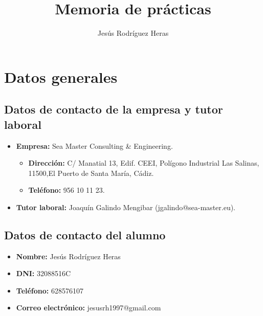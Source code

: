 \documentclass[12pt,letterpaper]{article}
\title{Memoria de prácticas}
\author{Jesús Rodríguez Heras}
\begin{document}
	
	\maketitle
%			
	\thispagestyle{empty}
	\newpage
	
	\tableofcontents
	\newpage
	
	
	
	
	\lstset{language=bash, numbers=left, numberstyle=\tiny, numbersep=10pt, firstnumber=1, stepnumber=1, basicstyle=\small\ttfamily, tabsize=1, extendedchars=true, inputencoding=utf8/latin1, breaklines=true}
	
\section{Datos generales}
\subsection{Datos de contacto de la empresa y tutor laboral}
\begin{itemize}
	\item \textbf{Empresa:} Sea Master Consulting \& Engineering.
	\begin{itemize}
		\item \textbf{Dirección:} C/ Manatial 13, Edif. CEEI, Polígono Industrial Las Salinas, 11500,El Puerto de Santa María, Cádiz.
		\item \textbf{Teléfono:} 956 10 11 23.
	\end{itemize}
	\item \textbf{Tutor laboral:} Joaquín Galindo Mengibar (jgalindo@sea-master.eu).
\end{itemize}

\subsection{Datos de contacto del alumno}
\begin{itemize}
	\item \textbf{Nombre:} Jesús Rodríguez Heras
	\item \textbf{DNI:} 32088516C
	\item \textbf{Teléfono:} 628576107
	\item \textbf{Correo electrónico:} jesusrh1997@gmail.com
\end{itemize}
\end{document}
